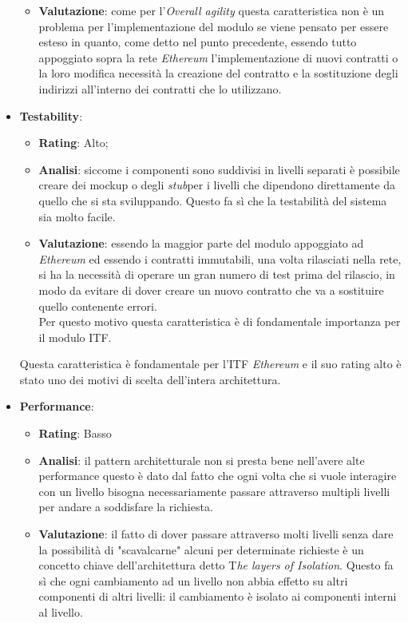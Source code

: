 \begin{itemize}
\begin{itemize}
		\item \textbf{Valutazione}: come per l'\textit{Overall agility} questa caratteristica non è un problema per l'implementazione del modulo se viene pensato per essere esteso in quanto, come detto nel punto precedente, essendo tutto appoggiato sopra la rete \textit{Ethereum} l'implementazione di nuovi contratti o la loro modifica necessità la creazione del contratto e la sostituzione degli indirizzi all'interno dei contratti che lo utilizzano.
	\end{itemize}
	\item \textbf{Testability}:
	\begin{itemize}
		\item \textbf{Rating}: Alto;
		\item \textbf{Analisi}: siccome i componenti sono suddivisi in livelli separati è possibile creare dei mockup o degli \emph{\gls{stub}}\glsfirstoccur per i livelli che dipendono direttamente da quello che si sta sviluppando. Questo fa sì che la testabilità del sistema sia molto facile\cite{3tierArch,3tierArch2}.\\
		\item \textbf{Valutazione}: essendo la maggior parte del modulo appoggiato ad \textit{Ethereum} ed essendo i contratti immutabili, una volta rilasciati nella rete, si ha la necessità di operare un gran numero di test prima del rilascio, in modo da evitare di dover creare un nuovo contratto che va a sostituire quello contenente errori.\\
		Per questo motivo questa caratteristica è di fondamentale importanza per il modulo \gls{ITF}.		
	\end{itemize}
	Questa caratteristica è fondamentale per l'\gls{ITF} \textit{Ethereum} e il suo rating alto è stato uno dei motivi di scelta dell'intera architettura.
	\item \textbf{Performance}:
	\begin{itemize}
		\item \textbf{Rating}: Basso
		\item \textbf{Analisi}: il pattern architetturale non si presta bene nell'avere alte performance questo è dato dal fatto che ogni volta che si vuole interagire con un livello bisogna necessariamente passare attraverso multipli livelli per andare a soddisfare la richiesta\cite{3tierArch, 3tierArch2}.
		\item \textbf{Valutazione}: il fatto di dover passare attraverso molti livelli senza dare la possibilità di "scavalcarne" alcuni per determinate richieste è un concetto chiave dell'architettura detto T\textit{he layers of Isolation}. Questo fa sì che ogni cambiamento ad un livello non abbia effetto su altri componenti di altri livelli: il cambiamento è isolato ai componenti interni al livello.\\

\end{itemize}
\end{itemize}
